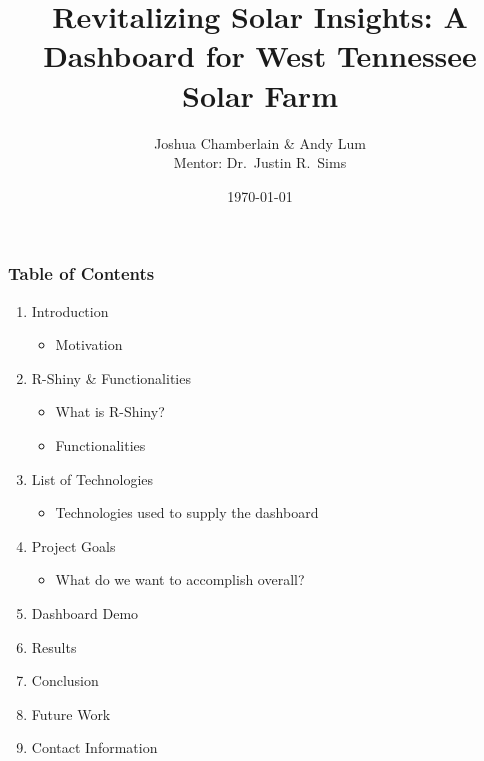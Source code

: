 \documentclass[xcolor=table]{beamer}
\begin{document}
\title{Revitalizing Solar Insights: A Dashboard for West Tennessee Solar Farm}

\author{Joshua Chamberlain \& Andy Lum \\ \vspace{0.1in} Mentor: Dr.~Justin R.~Sims}
\date{\today}



\frame{\titlepage}
\begin{frame}[c] %
%
%
\frametitle{Table of Contents} 
\begin{enumerate}
    \item<1-> Introduction
    \begin{itemize}
        \item<2-> Motivation
    \end{itemize}

    \item<3-> R-Shiny \& Functionalities
    \begin{itemize}
        \item<4-> What is R-Shiny?
        \item<5-> Functionalities
    \end{itemize}

    \item<6-> List of Technologies
    \begin{itemize}
        \item<7-> Technologies used to supply the dashboard
    \end{itemize}

    \item<8-> Project Goals
    \begin{itemize}
        \item<9-> What do we want to accomplish overall?
    \end{itemize}

    \item<10-> Dashboard Demo

    \item<11-> Results

    \item<12-> Conclusion

    \item<13-> Future Work

    \item<14-> Contact Information
\end{enumerate}
\end{frame}
\end{document}
